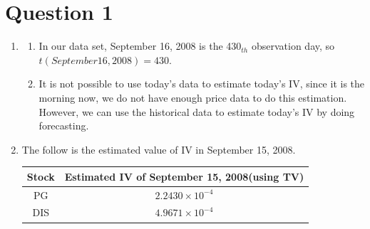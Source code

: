 \documentclass[12pt,letterpaper]{article}
\begin{document}
\section*{Question 1}
  \begin{enumerate}[label=\textbf{(\Alph*)}]
\item
\begin{enumerate}[label=(\roman*)]
\item In our data set, September 16, 2008 is the 430$_{th}$ observation day, so $t(September 16,2008)=430$.



\item It is not possible to use today's data to estimate today's IV, since it is the morning now, we do not have enough price data to do this estimation. However, we can use the historical data to estimate today's IV by doing forecasting.
 \end{enumerate}
 
 
\item The follow is the estimated value of IV in September 15, 2008.
\begin{table}[ht]
\centering %
\begin{tabular}{c c} %
\hline\hline %
Stock & Estimated IV of September 15, 2008(using TV)\\ [0.5ex] %
\hline %
PG &  $2.2430\times 10^{-4}$  \\ %
DIS & $4.9671\times 10^{-4}$ \\ %
\hline %
\end{tabular}
\end{table}
\vspace{-6mm}


\end{enumerate}
\end{document}
